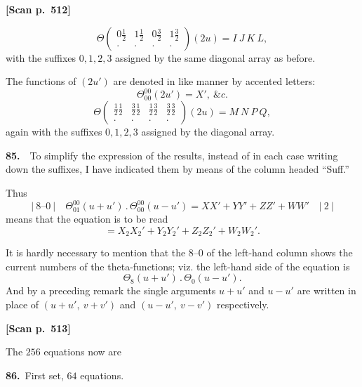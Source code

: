 \documentclass[11pt]{article}
\begin{document}
\bigskip

\noindent\textbf{[Scan p.~512]}

\medskip

\[
\Theta\!\begin{pmatrix}0\tfrac{1}{2} & 1\tfrac{1}{2} & 0\tfrac{3}{2} & 1\tfrac{3}{2}\\[-2pt] \cdot & \cdot & \cdot & \cdot\end{pmatrix}(2u) = I\ J\ K\ L,
\]
with the suffixes $0,1,2,3$ assigned by the same diagonal array as before.

\medskip

\noindent The functions of $(2u')$ are denoted in like manner by accented letters:
\[
\Theta_{00}^{00}(2u') = X',\ \&c.
\]
\[
\Theta\!\begin{pmatrix}\tfrac{1}{2}\tfrac{1}{2} & \tfrac{3}{2}\tfrac{1}{2} & \tfrac{1}{2}\tfrac{3}{2} & \tfrac{3}{2}\tfrac{3}{2}\\[-2pt] \cdot & \cdot & \cdot & \cdot\end{pmatrix}(2u) = M\ N\ P\ Q,
\]
again with the suffixes $0,1,2,3$ assigned by the diagonal array.

\medskip

\textbf{85.}\ \ To simplify the expression of the results, instead of in each case writing down the suffixes, I have indicated them by means of the column headed ``Suff.''

\smallskip

Thus
\[
\bigl|\ 8\text{--}0\ \bigr|\quad \Theta_{01}^{00}(u+u')\,.\,\Theta_{00}^{00}(u-u') = XX' + YY' + ZZ' + WW' \quad \bigl|\ 2\ \bigr|
\]
means that the equation is to be read
\[
= X_2 X_2' + Y_2 Y_2' + Z_2 Z_2' + W_2 W_2'.
\]

\medskip

\noindent It is hardly necessary to mention that the $8\text{--}0$ of the left-hand column shows the current numbers of the theta-functions; viz. the left-hand side of the equation is
\[
\Theta_8(u+u')\,.\,\Theta_0(u-u').
\]
And by a preceding remark the single arguments $u+u'$ and $u-u'$ are written in place of $(u+u',\ v+v')$ and $(u-u',\ v-v')$ respectively.

\bigskip

\noindent\textbf{[Scan p.~513]}

\medskip

\noindent The $256$ equations now are

\medskip

\begin{center}
\textbf{86.}\ First set, $64$ equations.
\end{center}
\end{document}

